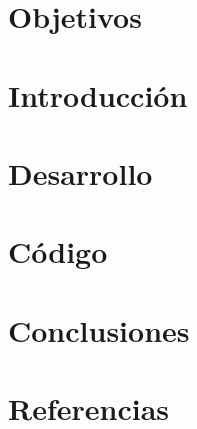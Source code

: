\documentclass[12pt]{article}
\begin{document}


\section{Objetivos}



\section{Introducción}



\section{Desarrollo}



\section{Código}



\section{Conclusiones}



\newpage

\section{Referencias}


\end{document}
